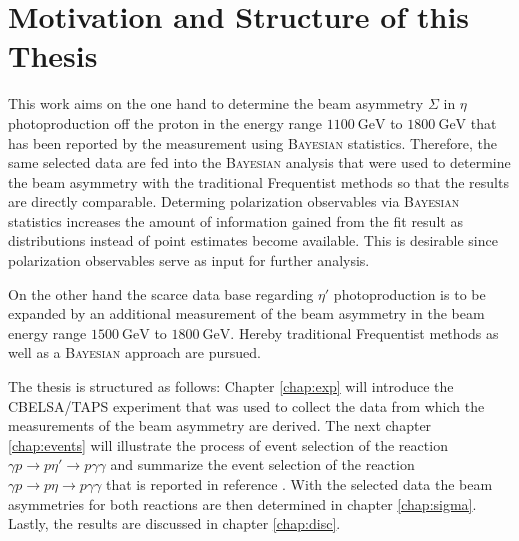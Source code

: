 \section{Motivation and Structure of this Thesis}
This work aims on the one hand to determine the beam asymmetry $\Sigma$ in $\eta$ photoproduction off the proton in the energy range $\SI{1100}{\giga\eV}$ to $\SI{1800}{\giga\eV}$ that has been reported by the measurement \cite{farahphd} using \textsc{Bayesian} statistics. Therefore, the same selected data are fed into the \textsc{Bayesian} analysis that were used to determine the beam asymmetry with the traditional Frequentist methods so that the results are directly comparable. Determing polarization observables via \textsc{Bayesian} statistics increases the amount of information gained from the fit result as distributions instead of point estimates become available. This is desirable since polarization observables serve as input for further analysis.

On the other hand the scarce data base regarding $\eta'$ photoproduction is to be expanded by an additional measurement of the beam asymmetry in the beam energy range $\SI{1500}{\giga\eV}$ to $\SI{1800}{\giga\eV}$. Hereby traditional Frequentist methods as well as a \textsc{Bayesian} approach are pursued.

The thesis is structured as follows: Chapter \ref{chap:exp} will introduce the CBELSA/TAPS experiment that was used to collect the data from which the measurements of the beam asymmetry are derived. The next chapter \ref{chap:events} will illustrate the process of event selection of the reaction $\gamma p \to p\eta'\to p\gamma\gamma$ and summarize the event selection of the reaction $\gamma p \to p\eta\to p\gamma\gamma$ that is reported in reference \cite{farahphd}. With the selected data the beam asymmetries for both reactions are then determined in chapter \ref{chap:sigma}. Lastly, the results are discussed in chapter \ref{chap:disc}.   
